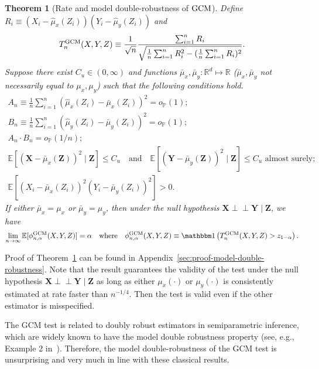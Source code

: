 \documentclass[12pt]{article}
\newtheorem{theorem}{Theorem}
\theoremstyle{definition}
\newcommand{\indep}{\perp \!\!\! \perp}
\def\P{\mathbb{P}}
\def\P{\mathbb{P}}
\newcommand{\E}{\mathbb E}								%
\renewcommand{\P}{\mathbb{P}}							%
\newcommand{\indicator}{\mathbbm 1}						%
\newcommand{\prx}{\bm X}								%
\newcommand{\srx}{X}									%
\newcommand{\prz}{\bm Z}								%
\newcommand{\srz}{Z}									%
\newcommand{\pry}{{\bm Y}}								%
\newcommand{\sry}{Y}									%
\newcommand{\GCM}{\textnormal{GCM}}						%
\begin{document}
\begin{theorem}[Rate and model double-robustness of $\GCM$]\label{thm:model-double-robustness}
	Define $R_i\equiv (\srx_i-\widehat\mu_{x}(\srz_i))(\sry_i-\widehat\mu_{y}(\srz_i))$ and 
	\begin{align*}
		T_n^{\GCM}(\srx,\sry,\srz)\equiv \frac{1}{\sqrt{n}}\frac{\sum_{i=1}^n R_i}{\sqrt{\frac{1}{n}\sum_{i=1}^n R_i^2- (\frac{1}{n}\sum_{i=1}^n R_i)^2}}.
	\end{align*}
	Suppose there exist $C_u\in (0,\infty)$ and functions $\bar\mu_x,\bar \mu_y:\mathbb{R}^d\mapsto \mathbb{R}$ ($\bar\mu_x,\bar \mu_y$ not necessarily equal to $\mu_x, \mu_y$) such that the following conditions hold.
	\begin{align}
		A_n\equiv \frac{1}{n}\sum_{i=1}^n\left(\widehat{\mu}_{x}(\srz_{i})-\bar\mu_{x}(\srz_{i})\right)^2=o_\P(1);\label{eq:consistency-mu-x}\\
		B_n\equiv \frac{1}{n}\sum_{i=1}^n\left(\widehat{\mu}_{y}(\srz_{i})-\bar\mu_{y}(\srz_{i})\right)^2=o_\P(1);\label{eq:consistency-mu-y}\\
		A_n\cdot B_n=o_\P(1/n)\label{eq:MSE-rate};\\
		\E[(\prx-\bar\mu_{x}(\prz))^2\mid \prz]\leq C_u\quad\text{and}\quad \E[(\pry-\bar\mu_{y}(\prz))^2\mid \prz]\leq C_u\text{ almost surely};\label{eq:bounded-mu}\\
		\E[(\srx_i-\bar\mu_{x}(\srz_i))^2(\sry_i-\bar\mu_{y}(\srz_i))^2]>0\label{eq:non-degeneracy}.
	\end{align}
	If either $\bar\mu_x=\mu_x$ or $\bar \mu_y=\mu_y$, then under the null hypothesis $\prx\indep\pry\mid\prz$, we have
	\begin{align*}
		\lim_{n\rightarrow\infty}\E[\phi_{n,\alpha}^{\GCM}(\srx,\sry,\srz)]=\alpha\quad\text{where}\quad \phi_{n,\alpha}^{\GCM}(\srx,\sry,\srz)\equiv\indicator\left(T_n^{\GCM}(\srx,\sry,\srz)>z_{1-\alpha}\right).
	\end{align*}
\end{theorem}
Proof of Theorem~\ref{thm:model-double-robustness} can be found in Appendix~\ref{sec:proof-model-double-robustness}. Note that the result guarantees the validity of the test under the null hypothesis $\prx\indep\pry\mid\prz$ as long as either $\mu_{x}(\cdot)$ or $\mu_{y}(\cdot)$ is consistently estimated at rate faster than $n^{-1/4}$. Then the test is valid even if the other estimator is misspecified.  

The GCM test is related to doubly robust estimators in semiparametric inference, which are widely known to have the model double robustness property (see, e.g., Example 2 in~\citet{Robins2001}). Therefore, the model double-robustness of the GCM test is unsurprising and very much in line with these classical results. 
\end{document}
